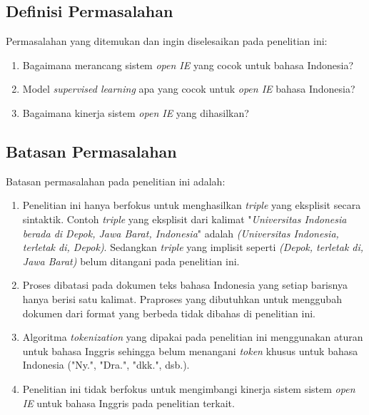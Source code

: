 \subsection{Definisi Permasalahan}

Permasalahan yang ditemukan dan ingin diselesaikan pada penelitian ini:

\begin{enumerate}
\item Bagaimana merancang sistem \textit{open IE} yang cocok untuk bahasa Indonesia?
\item Model \textit{supervised learning} apa yang cocok untuk \textit{open IE} bahasa Indonesia?
\item Bagaimana kinerja sistem \textit{open IE} yang dihasilkan?
\end{enumerate}

\subsection{Batasan Permasalahan}

Batasan permasalahan pada penelitian ini adalah:

\begin{enumerate}
\item Penelitian ini hanya berfokus untuk menghasilkan \textit{triple} yang eksplisit secara sintaktik. Contoh \textit{triple} yang eksplisit dari kalimat "\textit{Universitas Indonesia berada di Depok, Jawa Barat, Indonesia}" adalah \textit{(Universitas Indonesia, terletak di, Depok)}. Sedangkan \textit{triple} yang implisit seperti \textit{(Depok, terletak di, Jawa Barat)} belum ditangani pada penelitian ini.

\item Proses dibatasi pada dokumen teks bahasa Indonesia yang setiap barisnya hanya berisi satu kalimat. Praproses yang dibutuhkan untuk menggubah dokumen dari format yang berbeda tidak dibahas di penelitian ini.

\item Algoritma \textit{tokenization} yang dipakai pada penelitian ini menggunakan aturan untuk bahasa Inggris sehingga belum menangani \textit{token} khusus untuk bahasa Indonesia ("Ny.", "Dra.", "dkk.", dsb.).

\item Penelitian ini tidak berfokus untuk mengimbangi kinerja sistem sistem \textit{open IE} untuk bahasa Inggris pada penelitian terkait.

\end{enumerate}

